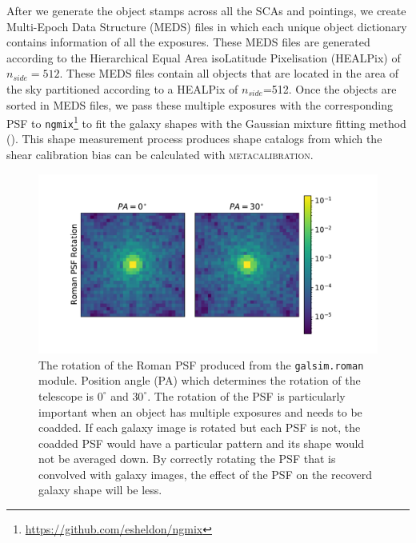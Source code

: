 {After we generate the object stamps across all the SCAs and pointings, we create Multi-Epoch Data Structure (MEDS) files in which each unique object dictionary contains information of all the exposures. These MEDS files are generated according to the Hierarchical Equal Area isoLatitude Pixelisation (HEALPix) of $n_{side}=512$. These MEDS files contain all objects that are located in the area of the sky partitioned according to a HEALPix of $n_{side}$=512. Once the objects are sorted in MEDS files, we pass these multiple exposures with the corresponding PSF to \texttt{ngmix}\footnote{\url{ https://github.com/esheldon/ngmix}} to fit the galaxy shapes with the Gaussian mixture fitting method (\citealt{2014MNRAS.444L..25S}). This shape measurement process produces shape catalogs from which the shear calibration bias can be calculated with \textsc{metacalibration}.

\begin{figure}
	\includegraphics[width=\columnwidth]{figure1.pdf}
	\vspace*{-3mm}
    \caption{The rotation of the Roman PSF produced from the \texttt{galsim.roman} module. Position angle (PA) which determines the rotation of the telescope is $0^{\circ}$ and $30^{\circ}$. The rotation of the PSF is particularly important when an object has multiple exposures and needs to be coadded. If each galaxy image is rotated but each PSF is not, the coadded PSF would have a particular pattern and its shape would not be averaged down. By correctly rotating the PSF that is convolved with galaxy images, the effect of the PSF on the recoverd galaxy shape will be less.}
    \label{fig:psfrot}
\end{figure}

}
